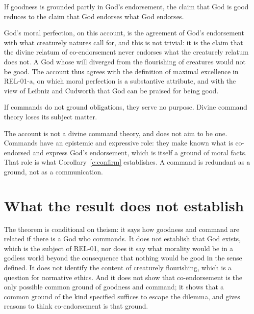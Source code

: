 \documentclass{situationist-preprint}
\begin{document}
\begin{objection}
If goodness is grounded partly in God's endorsement, the claim that God is good reduces to the claim that God endorses what God endorses.
\end{objection}

\begin{reply}
God's moral perfection, on this account, is the agreement of God's endorsement with what creaturely natures call for, and this is not trivial: it is the claim that the divine relatum of co-endorsement never endorses what the creaturely relatum does not. A God whose will diverged from the flourishing of creatures would not be good. The account thus agrees with the definition of maximal excellence in REL-01-a, on which moral perfection is a substantive attribute, and with the view of Leibniz and Cudworth that God can be praised for being good.
\end{reply}

\begin{objection}
If commands do not ground obligations, they serve no purpose. Divine command theory loses its subject matter.
\end{objection}

\begin{reply}
The account is not a divine command theory, and does not aim to be one. Commands have an epistemic and expressive role: they make known what is co-endorsed and express God's endorsement, which is itself a ground of moral facts. That role is what Corollary~\ref{c:confirm} establishes. A command is redundant as a ground, not as a communication.
\end{reply}

\section{What the result does not establish}

The theorem is conditional on theism: it says how goodness and command are related if there is a God who commands. It does not establish that God exists, which is the subject of REL-01, nor does it say what morality would be in a godless world beyond the consequence that nothing would be good in the sense defined. It does not identify the content of creaturely flourishing, which is a question for normative ethics. And it does not show that co-endorsement is the only possible common ground of goodness and command; it shows that a common ground of the kind specified suffices to escape the dilemma, and gives reasons to think co-endorsement is that ground.
\end{document}
